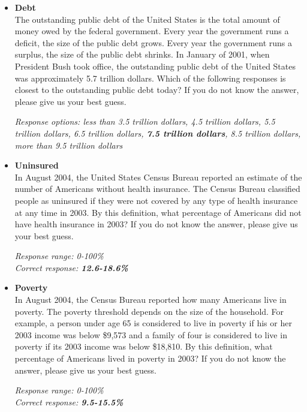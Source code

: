 \documentclass[12pt, letterpaper]{article}
\begin{document}
\begin{itemize}
\item \textbf{Debt} \\
The outstanding public debt of the United States is the total amount of money owed by the federal government. Every year the government runs a deficit, the size of the public debt grows. Every year the government runs a surplus, the size of the public debt shrinks. In January of 2001, when President Bush took office, the outstanding public debt of the United States was approximately 5.7 trillion dollars. Which of the following responses is closest to the outstanding public debt today? If you do not know the answer, please give us your best guess.

 \textit{Response options: less than 3.5 trillion dollars, 4.5 trillion dollars, 5.5 trillion dollars, 6.5 trillion dollars, \textbf{7.5 trillion dollars}, 8.5 trillion dollars, more than 9.5 trillion dollars}
   \end{itemize}

\begin{itemize}
\item \textbf{Uninsured} \\
In August 2004, the United States Census Bureau reported an estimate of the number of Americans without health insurance. The Census Bureau classified people as uninsured if they were not covered by any type of health insurance at any time in 2003. By this definition, what percentage of Americans did not have health insurance in 2003? If you do not know the answer, please give us your best guess.

\textit{Response range: 0-100\%} \\
\textit{Correct response: \textbf{12.6-18.6\%}}
   \end{itemize}

\begin{itemize}
\item \textbf{Poverty} \\
In August 2004, the Census Bureau reported how many Americans live in poverty. The poverty threshold depends on the size of the household. For example, a person under age 65 is considered to live in poverty if his or her 2003 income was below \$9,573 and a family of four is considered to live in poverty if its 2003 income was below \$18,810. By this definition, what percentage of Americans lived in poverty in 2003? If you do not know the answer, please give us your best guess.

\textit{Response range: 0-100\%} \\
\textit{Correct response: \textbf{9.5-15.5\%}}
   \end{itemize}
\end{document}
